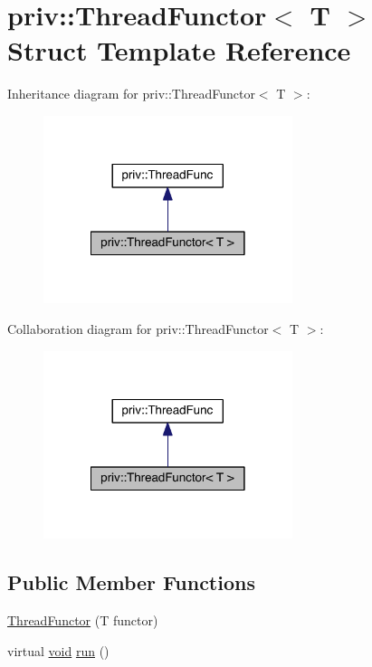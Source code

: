 \hypertarget{structpriv_1_1_thread_functor}{\section{priv\-:\-:Thread\-Functor$<$ T $>$ Struct Template Reference}
\label{structpriv_1_1_thread_functor}
}


Inheritance diagram for priv\-:\-:Thread\-Functor$<$ T $>$\-:
\nopagebreak
\begin{figure}[H]
\begin{center}
\leavevmode
\includegraphics[width=206pt]{structpriv_1_1_thread_functor__inherit__graph}
\end{center}
\end{figure}


Collaboration diagram for priv\-:\-:Thread\-Functor$<$ T $>$\-:
\nopagebreak
\begin{figure}[H]
\begin{center}
\leavevmode
\includegraphics[width=206pt]{structpriv_1_1_thread_functor__coll__graph}
\end{center}
\end{figure}
\subsection*{Public Member Functions}
\begin{DoxyCompactItemize}
\item 
\hyperlink{structpriv_1_1_thread_functor_a2df57df5cd6f7396b033512bb0e01848}{Thread\-Functor} (T functor)
\item 
virtual \hyperlink{glutf90_8h_ac778d6f63f1aaf8ebda0ce6ac821b56e}{void} \hyperlink{structpriv_1_1_thread_functor_a8bb44b4b46d08d844d070ae3fdb251d7}{run} ()
\end{DoxyCompactItemize}

